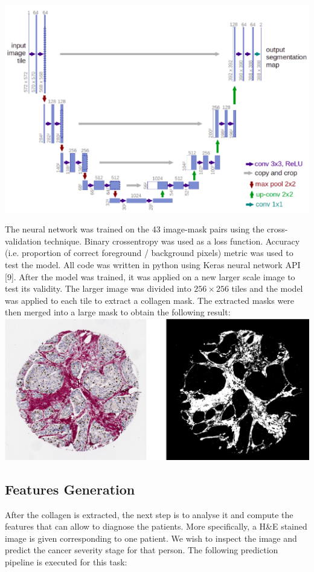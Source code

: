 \documentclass{article}
\begin{document}
\includegraphics[width=\textwidth]{images/unet.png}

The neural network was trained on the 43 image-mask pairs using the
cross-validation technique. Binary crossentropy was used as a loss function.
Accuracy (i.e. proportion of correct foreground / background pixels) metric
was used to test the model. All code was written in python using Keras
neural network API [9]. After the model was trained, it was applied on a new
larger scale image to test its validity. The larger image was divided
into $256 \times 256$ tiles and the model was applied to each tile to extract
a collagen mask. The extracted masks were then merged into a large mask to obtain the
following result: \\

\includegraphics[width=\textwidth]{images/test.png}

\subsection{Features Generation}

After the collagen is extracted, the next step is to analyse it and compute
the features that can allow to diagnose the patients. More specifically, a
H\&E stained image is given corresponding to one patient. We wish to
inspect the image and predict the cancer severity stage for that person. The
following prediction pipeline is executed for this task:
\end{document}
